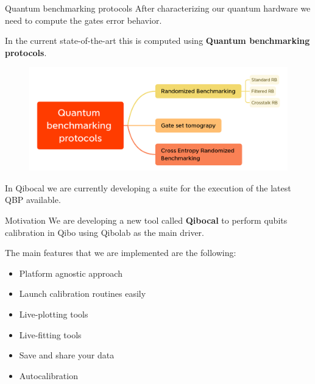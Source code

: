 \documentclass[11p,aspectratio=169]{beamer}
\begin{document}
\begin{frame}{Quantum benchmarking protocols}
    After characterizing our quantum hardware we need to compute the gates
    error behavior.

    In the current state-of-the-art this is computed using \textbf{Quantum
        benchmarking protocols}.
    \begin{figure}
        \includegraphics[width= 0.8 \textwidth]{figures/Quantum protocols.png}
    \end{figure}

    In Qibocal we are currently developing a suite for the execution of the
    latest QBP available.
\end{frame}

\begin{frame}{Motivation}
    We are developing a new tool called {\color{blue} \textbf{Qibocal}} to perform qubits calibration in Qibo using Qibolab as the main driver.
    
    The main features that we are implemented are the following:


    \begin{multicols*}{2}
        \begin{itemize}
            \item[\faCaretSquareORight] Platform agnostic approach
            \item[\faCaretSquareORight] Launch calibration routines easily
            \item[\faCaretSquareORight] Live-plotting tools
            \item[\faCaretSquareORight] Live-fitting tools
            \item[\faCaretSquareORight] Save and share your data
            \item[\faCaretSquareORight] Autocalibration
        \end{itemize}
    \end{multicols*}
\end{frame}
\end{document}
